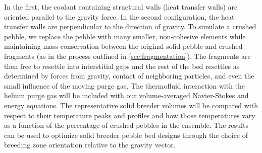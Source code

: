 In the first, the coolant containing structural walls (heat transfer walls) are oriented parallel to the gravity force. In the second configuration, the heat transfer walls are perpendicular to the direction of gravity. To simulate a crushed pebble, we replace the pebble with many smaller, non-cohesive elements while maintaining mass-conservation between the original solid pebble and crushed fragments (as in the process outlined in \cref{sec:fragmentation}). The fragments are then free to resettle into interstitial gaps and the rest of the bed resettles as determined by forces from gravity, contact of neighboring particles, and even the small influence of the moving purge gas. The thermofluid interaction with the helium purge gas will be included with our volume-averaged Navier-Stokes and energy equations. The representative solid breeder volumes will be compared with respect to their temperature peaks and profiles and how those temperatures vary as a function of the percentage of crushed pebbles in the ensemble. The results can be used to optimize solid breeder pebble bed designs through the choice of breeding zone orientation relative to the gravity vector.